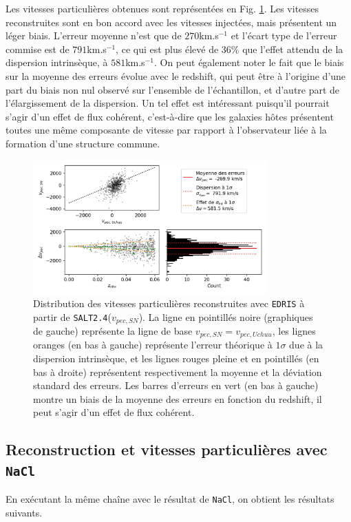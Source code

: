 \documentclass{book}
\def\nacl{\texttt{NaCl}\xspace}
\def\edris{\texttt{EDRIS}\xspace}
\def\saltd{\texttt{SALT2.4}\xspace}
\begin{document}
Les vitesses particulières obtenues sont représentées en Fig. \ref{fig:vp_salt}. Les vitesses reconstruites sont en bon accord avec les vitesses injectées, mais présentent un léger biais. L'erreur moyenne n'est que de $270$km.s$^{-1}$ et l'écart type de l'erreur commise est de $791$km.s$^{-1}$, ce qui est plus élevé de 36\% que l'effet attendu de la dispersion intrinsèque, à $581$km.s$^{-1}$. On peut également noter le fait que le biais sur la moyenne des erreurs évolue avec le redshift, qui peut être à l'origine d'une part du biais non nul observé sur l'ensemble de l'échantillon, et d'autre part de l'élargissement de la dispersion. Un tel effet est intéressant puisqu'il pourrait s'agir d'un effet de flux cohérent, c'est-à-dire que les galaxies hôtes présentent toutes une même composante de vitesse par rapport à l'observateur liée à la formation d'une structure commune. 

\begin{figure}
	\centering
	\includegraphics[width=0.8\textwidth]{figures/vp_salt.png}
	\caption{Distribution des vitesses particulières reconstruites avec \edris à partir de \saltd ($v_{pec,SN}$). La ligne en pointillés noire (graphiques de gauche) représente la ligne de base $v_{pec, SN} = v_{pec, Uchuu}$, les lignes oranges (en bas à gauche) représente l'erreur théorique à $1\sigma$ due à la dispersion intrinsèque, et les lignes rouges pleine et en pointillés (en bas à droite) représentent respectivement la moyenne et la déviation standard des erreurs. Les barres d'erreurs en vert (en bas à gauche) montre un biais de la moyenne des erreurs en fonction du redshift, il peut s'agir d'un effet de flux cohérent.}
	\label{fig:vp_salt}
\end{figure}


\subsection{Reconstruction et vitesses particulières avec \nacl}
En exécutant la même chaîne avec le résultat de \nacl, on obtient les résultats suivants.
\end{document}
